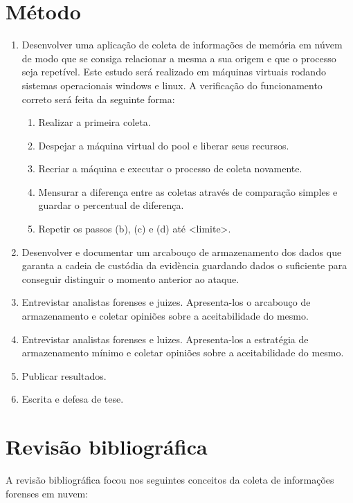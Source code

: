 \documentclass[12pt,				%
	openright,			%
	oneside,			%
	a4paper,			%
	english,			%
	brazil				%
	]{abntex2}
\begin{document}
\chapter{Método} \label{chap:metodo}
\begin{enumerate}
 \item Desenvolver uma aplicação de coleta de informações de memória em núvem de modo que se consiga relacionar a mesma a sua origem e que
o processo seja repetível. Este estudo será realizado em máquinas virtuais rodando sistemas operacionais windows e linux. A verificação do funcionamento correto será feita 
da seguinte forma:

\begin{enumerate}
 \item Realizar a primeira coleta.
 \item Despejar a máquina virtual do pool e liberar seus recursos.
 \item Recriar a máquina e executar o processo de coleta novamente.
 \item Mensurar a diferença entre as coletas através de comparação simples e guardar o percentual de diferença.
 \item Repetir os passos (b), (c) e (d) até <limite>.
\end{enumerate}

\item Desenvolver e documentar um arcabouço de armazenamento dos dados que garanta a cadeia de custódia da evidència guardando dados o suficiente para 
conseguir distinguir o momento anterior ao ataque.

\item Entrevistar analistas forenses e juizes. Apresenta-los o arcabouço de armazenamento e coletar opiniões sobre a aceitabilidade do mesmo.

\item Entrevistar analistas forenses e luizes. Apresenta-los a estratégia de armazenamento mínimo e coletar opiniões sobre a aceitabilidade do mesmo. 

\item Publicar resultados.

\item Escrita e defesa de tese.

\end{enumerate}

\chapter{Revisão bibliográfica} \label{chap:related}
A revisão bibliográfica focou nos seguintes conceitos da coleta de informações forenses em nuvem:
\end{document}
